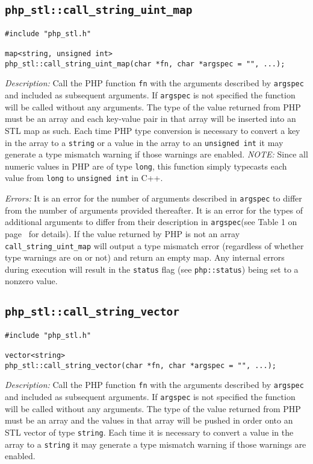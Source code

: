 \documentclass[11pt,titlepage]{article}
\begin{document}
\subsection{\texttt{php\_stl::call\_string\_uint\_map}}

\begin{verbatim}
#include "php_stl.h"

map<string, unsigned int> 
php_stl::call_string_uint_map(char *fn, char *argspec = "", ...);
\end{verbatim}

\emph{Description:} Call the PHP function \verb|fn| with the arguments described by \verb|argspec| and included as subsequent arguments. If \verb|argspec| is not specified the function will be called without any arguments. The type of the value returned from PHP must be an array and each key-value pair in that array will be inserted into an STL map as such. Each time PHP type conversion is necessary to convert a key in the array to a \verb|string| or a value in the array to an \verb|unsigned int| it may generate a type mismatch warning if those warnings are enabled. \emph{NOTE:} Since all numeric values in PHP are of type \verb|long|, this function simply typecasts each value from \verb|long| to \verb|unsigned int| in C++.

\emph{Errors:} It is an error for the number of arguments described in \verb|argspec| to differ from the number of arguments provided thereafter. It is an error for the types of additional arguments to differ from their description in \verb|argspec|(see Table 1 on page~\pageref{Table1} for details). If the value returned by PHP is not an array \verb|call_string_uint_map| will output a type mismatch error (regardless of whether type warnings are on or not) and return an empty map. Any internal errors during execution will result in the \verb|status| flag (see \verb|php::status|) being set to a nonzero value.


\subsection{\texttt{php\_stl::call\_string\_vector}}

\begin{verbatim}
#include "php_stl.h"

vector<string> 
php_stl::call_string_vector(char *fn, char *argspec = "", ...);
\end{verbatim}

\emph{Description:} Call the PHP function \verb|fn| with the arguments described by \verb|argspec| and included as subsequent arguments. If \verb|argspec| is not specified the function will be called without any arguments. The type of the value returned from PHP must be an array and the values in that array will be pushed in order onto an STL vector of type \verb|string|. Each time it is necessary to convert a value in the array to a \verb|string| it may generate a type mismatch warning if those warnings are enabled.
\end{document}
